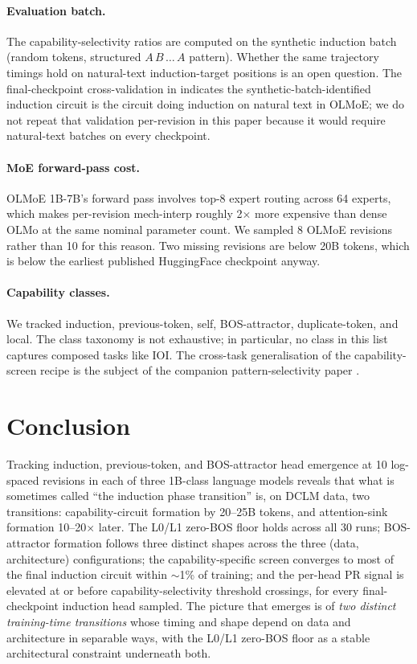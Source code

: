 \documentclass[11pt]{article}
\begin{document}
\paragraph{Evaluation batch.} The capability-selectivity ratios are
computed on the synthetic induction batch (random tokens, structured
$A\,B\,\ldots\,A$ pattern). Whether the same trajectory timings hold on
natural-text induction-target positions is an open question. The
final-checkpoint cross-validation in \citet{paper1_methodology} indicates
the synthetic-batch-identified induction circuit is the circuit doing
induction on natural text in OLMoE; we do not repeat that validation
per-revision in this paper because it would require natural-text batches
on every checkpoint.

\paragraph{MoE forward-pass cost.} OLMoE 1B-7B's forward pass involves
top-8 expert routing across 64 experts, which makes per-revision
mech-interp roughly 2$\times$ more expensive than dense OLMo at the same
nominal parameter count. We sampled 8 OLMoE revisions rather than 10 for
this reason. Two missing revisions are below 20B tokens, which is below
the earliest published HuggingFace checkpoint anyway.

\paragraph{Capability classes.} We tracked induction, previous-token,
self, BOS-attractor, duplicate-token, and local. The class taxonomy is
not exhaustive; in particular, no class in this list captures composed
tasks like IOI. The cross-task generalisation of the capability-screen
recipe is the subject of the companion pattern-selectivity paper
\citep{paper3_circuits}.

\section{Conclusion}

Tracking induction, previous-token, and BOS-attractor head emergence at
10 log-spaced revisions in each of three 1B-class language models reveals
that what is sometimes called ``the induction phase transition'' is, on
DCLM data, two transitions: capability-circuit formation by 20--25B
tokens, and attention-sink formation 10--20$\times$ later. The L0/L1
zero-BOS floor holds across all 30 runs; BOS-attractor formation follows
three distinct shapes across the three (data, architecture) configurations;
the capability-specific screen converges to most of the final induction
circuit within $\sim$1\% of training; and the per-head PR signal is
elevated at or before capability-selectivity threshold crossings, for
every final-checkpoint induction head sampled. The picture that emerges
is of \emph{two distinct training-time transitions} whose timing and
shape depend on data and architecture in separable ways, with the L0/L1
zero-BOS floor as a stable architectural constraint underneath both.


\end{document}
